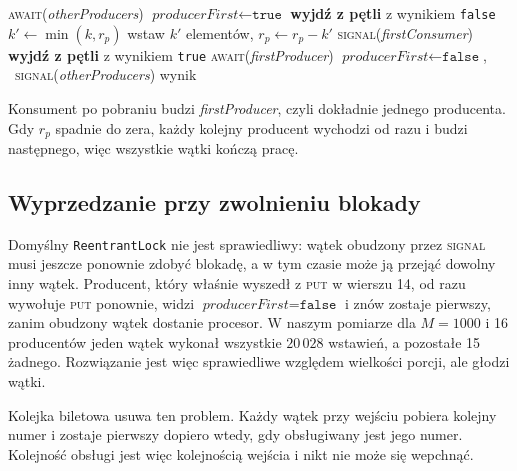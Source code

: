 \documentclass[11pt,a4paper]{article}
\newenvironment{algorytm}[1][htb]
  {\par\bigskip\floatname{algorithm}{}\renewcommand{\thealgorithm}{}
   \begin{algorithm}[#1]%
  }{\end{algorithm}\par\bigskip}
\begin{document}
\begin{algorytm}[H]
\begin{algorithmic}[1]
            \State \textsc{await}(\textit{otherProducers})
        \EndWhile
        \State $\textit{producerFirst} \gets \texttt{true}$
        \Loop
                \State \textbf{wyjdź z pętli} z wynikiem \texttt{false}
            \EndIf
            \State $k' \gets \min(k, r_p)$
                \State wstaw $k'$ elementów, $r_p \gets r_p - k'$
                \State \textsc{signal}(\textit{firstConsumer})
                \State \textbf{wyjdź z pętli} z wynikiem \texttt{true}
            \EndIf
            \State \textsc{await}(\textit{firstProducer})
        \EndLoop
        \State $\textit{producerFirst} \gets \texttt{false}$, \ \textsc{signal}(\textit{otherProducers})
        \State \Return wynik
    \EndProcedure
\end{algorithmic}
\caption{Wstawianie w rozwiązaniu z czterema warunkami}
\end{algorytm}

Konsument po pobraniu budzi \textit{firstProducer}, czyli dokładnie jednego producenta.
Gdy $r_p$ spadnie do zera, każdy kolejny producent wychodzi od razu i budzi następnego,
więc wszystkie wątki kończą pracę.

\subsection{Wyprzedzanie przy zwolnieniu blokady}
\label{sec:barging}
Domyślny \texttt{ReentrantLock} nie jest sprawiedliwy: wątek obudzony przez \textsc{signal}
musi jeszcze ponownie zdobyć blokadę, a w tym czasie może ją przejąć dowolny inny wątek.
Producent, który właśnie wyszedł z \textsc{put} w wierszu 14, od razu wywołuje \textsc{put}
ponownie, widzi $\textit{producerFirst} = \texttt{false}$ i znów zostaje pierwszy,
zanim obudzony wątek dostanie procesor. W naszym pomiarze dla $M = 1000$
i 16 producentów jeden wątek wykonał wszystkie $20\,028$ wstawień, a pozostałe 15 żadnego.
Rozwiązanie jest więc sprawiedliwe względem wielkości porcji, ale głodzi wątki.

Kolejka biletowa usuwa ten problem. Każdy wątek przy wejściu pobiera kolejny numer
i zostaje pierwszy dopiero wtedy, gdy obsługiwany jest jego numer. Kolejność obsługi
jest więc kolejnością wejścia i nikt nie może się wepchnąć.
\end{document}
